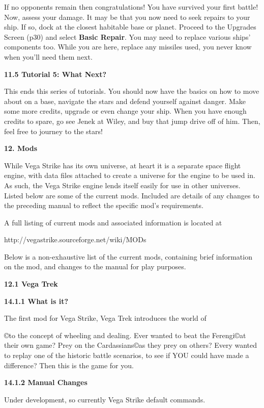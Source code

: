 \documentclass{article}
\begin{document}
If no opponents remain then congratulations! You have survived your first battle! Now, assess your damage. It may be that you now need to seek repairs to your ship. If so, dock at the closest habitable base or planet. Proceed to the Upgrades Screen (p30) and select \textbf{Basic Repair}. You may need to replace various ships' components too. While you are here, replace any missiles used, you never know when you'll need them next. 

\textbf{11.5 Tutorial 5: What Next? }

This ends this series of tutorials. You should now have the basics on how to move about on a base, navigate the stars and defend yourself against danger. Make some more credits, upgrade or even change your ship.  When you have enough credits to spare, go see Jenek at Wiley, and buy that jump drive off of him. Then, feel free to journey to the stars! 



\textbf{12. Mods }

While Vega Strike has its own universe, at heart it is a separate space flight engine, with data files attached to create a universe for the engine to be used in.  As such, the Vega Strike engine lends itself easily for use in other universes. Listed below are some of the current mods. Included are details of any changes to the preceding manual to reflect the specific mod's requirements. 

A full listing of current mods and associated information is located at 

http://vegastrike.sourceforge.net/wiki/MODs

Below is a non-exhaustive list of the current mods, containing brief information on the mod, and changes to the manual for play purposes. 

\textbf{12.1 Vega Trek }

\textbf{14.1.1 What is it? }

The first mod for Vega Strike, Vega Trek introduces the world of 

\copyright  to the concept of wheeling and dealing. Ever wanted to beat the Ferengi\copyright  at their own game? Prey on the Cardassians\copyright  as they prey on others? Every wanted to replay one of the historic battle scenarios, to see if YOU could have made a difference?  Then this is the game for you. 

\textbf{14.1.2 Manual Changes }

Under development, so currently Vega Strike default commands. 
\end{document}

